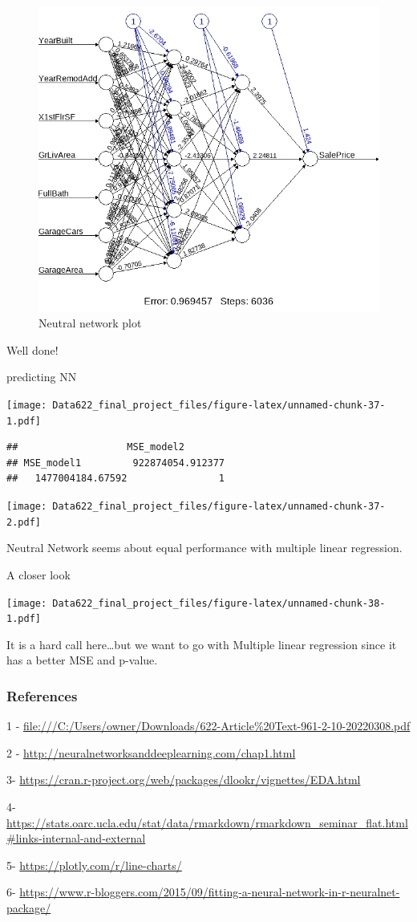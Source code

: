 \documentclass[
]{article}
\begin{document}
\begin{figure}
\centering
\includegraphics{NN_plot.jpeg}
\caption{Neutral network plot}
\end{figure}

Well done!

predicting NN

\texttt{[image: Data622\_final\_project\_files/figure-latex/unnamed-chunk-37-1.pdf]}

\begin{verbatim}
##                   MSE_model2
## MSE_model1         922874054.912377
##   1477004184.67592                1
\end{verbatim}

\texttt{[image: Data622\_final\_project\_files/figure-latex/unnamed-chunk-37-2.pdf]}

Neutral Network seems about equal performance with multiple linear
regression.

A closer look

\texttt{[image: Data622\_final\_project\_files/figure-latex/unnamed-chunk-38-1.pdf]}

It is a hard call here\ldots but we want to go with Multiple linear
regression since it has a better MSE and p-value.

\hypertarget{references}{%
\subsubsection{References}\label{references}}

1 -
\url{file:///C:/Users/owner/Downloads/622-Article\%20Text-961-2-10-20220308.pdf}

2 - \url{http://neuralnetworksanddeeplearning.com/chap1.html}

3-
\url{https://cran.r-project.org/web/packages/dlookr/vignettes/EDA.html}

4-
\url{https://stats.oarc.ucla.edu/stat/data/rmarkdown/rmarkdown_seminar_flat.html\#links-internal-and-external}

5- \url{https://plotly.com/r/line-charts/}

6-
\url{https://www.r-bloggers.com/2015/09/fitting-a-neural-network-in-r-neuralnet-package/}
\end{document}
